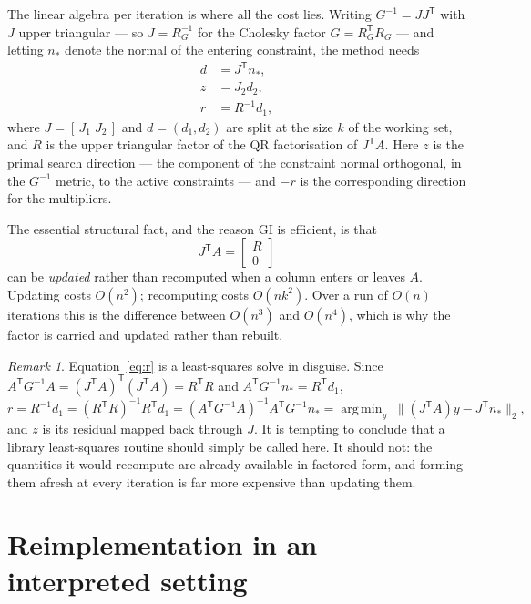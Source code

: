 \documentclass[11pt,a4paper]{article}
\theoremstyle{plain}
\theoremstyle{remark}
\newtheorem*{remark}{Remark}
\newcommand{\T}{^{\mathsf{T}}}
\DeclareMathOperator*{\argmin}{arg\,min}
\begin{document}
The linear algebra per iteration is where all the cost lies. Writing
$G^{-1} = J J\T$ with $J$ upper triangular --- so $J = R_G^{-1}$ for the Cholesky
factor $G = R_G\T R_G$ --- and letting $n_\ast$ denote the normal of the entering
constraint, the method needs
\begin{align}
  d &= J\T n_\ast, \label{eq:d}\\
  z &= J_2 d_2, \label{eq:z}\\
  r &= R^{-1} d_1, \label{eq:r}
\end{align}
where $J = [\,J_1 \; J_2\,]$ and $d = (d_1, d_2)$ are split at the size $k$ of
the working set, and $R$ is the upper triangular factor of the QR factorisation
of $J\T A$. Here $z$ is the primal search direction --- the component of the
constraint normal orthogonal, in the $G^{-1}$ metric, to the active constraints
--- and $-r$ is the corresponding direction for the multipliers.

The essential structural fact, and the reason GI is efficient, is that
\begin{equation}
  J\T A = \begin{bmatrix} R \\ 0 \end{bmatrix}
  \label{eq:invariant}
\end{equation}
can be \emph{updated} rather than recomputed when a column enters or leaves $A$.
Updating costs $O(n^2)$; recomputing costs $O(nk^2)$. Over a run of $O(n)$
iterations this is the difference between $O(n^3)$ and $O(n^4)$, which is why the
factor is carried and updated rather than rebuilt.

\begin{remark}
Equation~\eqref{eq:r} is a least-squares solve in disguise. Since
$A\T G^{-1} A = (J\T A)\T (J\T A) = R\T R$ and $A\T G^{-1} n_\ast = R\T d_1$,
\begin{equation}
  r = R^{-1} d_1 = (R\T R)^{-1} R\T d_1
    = (A\T G^{-1} A)^{-1} A\T G^{-1} n_\ast
    = \argmin_y \; \lVert (J\T A) y - J\T n_\ast \rVert_2 ,
  \label{eq:lsq}
\end{equation}
and $z$ is its residual mapped back through $J$. It is tempting to conclude that
a library least-squares routine should simply be called here. It should not: the
quantities it would recompute are already available in factored form, and forming
them afresh at every iteration is far more expensive than updating them.
\end{remark}

\section{Reimplementation in an interpreted setting}
\label{sec:reimpl}
\end{document}
